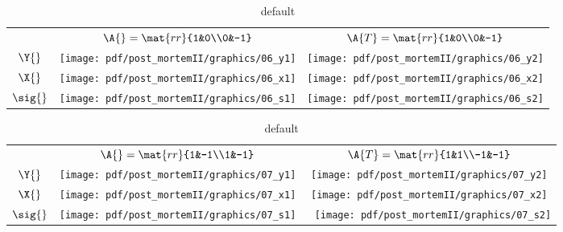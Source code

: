 \begin{table}[htdp]
\begin{center}
\begin{tabular}{ccc}
 & $\A{}  = \mat{rr}{1&0\\0&-1}$ 
 & $\A{T} = \mat{rr}{1&0\\0&-1}$ \\[35pt]
 $\Y{}$   & \qquad \texttt{[image: pdf/post\_mortemII/graphics/06\_y1]} 
          & \qquad \texttt{[image: pdf/post\_mortemII/graphics/06\_y2]} \\[15pt]
 $\X{}$   & \qquad \texttt{[image: pdf/post\_mortemII/graphics/06\_x1]}
          & \qquad \texttt{[image: pdf/post\_mortemII/graphics/06\_x2]} \\[20pt]
 $\sig{}$ & \quad  \texttt{[image: pdf/post\_mortemII/graphics/06\_s1]}
          & \quad  \texttt{[image: pdf/post\_mortemII/graphics/06\_s2]} \\[20pt]
\end{tabular}
\end{center}
\label{tab:pmII:visualsf}
\caption{default}
\end{table}%
\clearpage

\begin{table}[htdp]
\begin{center}
\begin{tabular}{ccc}
 & $\A{}  = \mat{rr}{1&-1\\1&-1}$ 
 & $\A{T} = \mat{rr}{1&1\\-1&-1}$ \\[35pt]
 $\Y{}$   & \qquad \texttt{[image: pdf/post\_mortemII/graphics/07\_y1]} 
          & \qquad \texttt{[image: pdf/post\_mortemII/graphics/07\_y2]} \\[15pt]
 $\X{}$   & \qquad \texttt{[image: pdf/post\_mortemII/graphics/07\_x1]}
          & \qquad \texttt{[image: pdf/post\_mortemII/graphics/07\_x2]} \\[20pt]
 $\sig{}$ & \quad  \texttt{[image: pdf/post\_mortemII/graphics/07\_s1]}
          & \,\    \texttt{[image: pdf/post\_mortemII/graphics/07\_s2]} \\[20pt]
\end{tabular}
\end{center}
\label{tab:pmII:visualsg}
\caption{default}
\end{table}%
\clearpage

